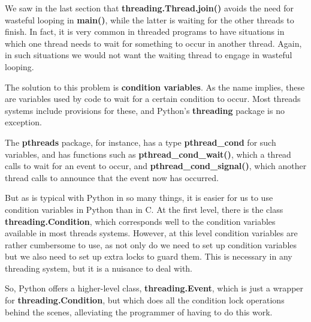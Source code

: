 We saw in the last section that {\bf threading.Thread.join()} avoids the
need for wasteful looping in {\bf main()}, while the latter is waiting
for the other threads to finish.  In fact, it is very common in threaded
programs to have situations in which one thread needs to wait for
something to occur in another thread.  Again, in such situations we
would not want the waiting thread to engage in wasteful looping.

The solution to this problem is {\bf condition variables}.  As the name
implies, these are variables used by code to wait for a certain
condition to occur.  Most threads systems include provisions for these,
and Python's {\bf threading} package is no exception.  

The {\bf pthreads} package, for instance, has a type {\bf pthread\_cond}
for such variables, and has functions such as {\bf
pthread\_cond\_wait()}, which a thread calls to wait for an event to
occur, and {\bf pthread\_cond\_signal()}, which another thread calls to
announce that the event now has occurred.

But as is typical with Python in so many things, it is easier for us to
use condition variables in Python than in C.  At the first level, there
is the class {\bf threading.Condition}, which corresponds well to the
condition variables available in most threads systems.  However, at this
level condition variables are rather cumbersome to use, as not only do
we need to set up condition variables but we also need to set up extra
locks to guard them.  This is necessary in any threading system, but it
is a nuisance to deal with.

So, Python offers a higher-level class, {\bf threading.Event}, which is
just a wrapper for {\bf threading.Condition}, but which does all the
condition lock operations behind the scenes, alleviating the programmer
of having to do this work.

